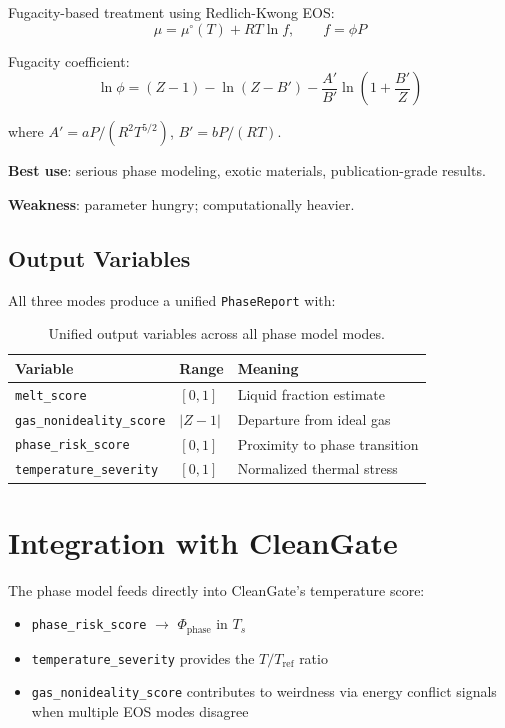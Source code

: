 \documentclass[11pt,a4paper]{article}
\begin{document}
Fugacity-based treatment using Redlich-Kwong EOS:
\begin{equation}
  \mu = \mu^\circ(T) + RT\ln f, \qquad f = \phi P
\end{equation}

Fugacity coefficient:
\begin{equation}
  \ln\phi = (Z-1) - \ln(Z - B') - \frac{A'}{B'}\ln\left(1 + \frac{B'}{Z}\right)
\end{equation}

where $A' = aP/(R^2 T^{5/2})$, $B' = bP/(RT)$.

\textbf{Best use}: serious phase modeling, exotic materials,
publication-grade results.

\textbf{Weakness}: parameter hungry; computationally heavier.

\subsection{Output Variables}

All three modes produce a unified \texttt{PhaseReport} with:

\begin{table}[h]
\centering
\begin{tabular}{lll}
\toprule
\textbf{Variable} & \textbf{Range} & \textbf{Meaning} \\
\midrule
\texttt{melt\_score}            & $[0,1]$ & Liquid fraction estimate \\
\texttt{gas\_nonideality\_score} & $|Z-1|$ & Departure from ideal gas \\
\texttt{phase\_risk\_score}      & $[0,1]$ & Proximity to phase transition \\
\texttt{temperature\_severity}   & $[0,1]$ & Normalized thermal stress \\
\bottomrule
\end{tabular}
\caption{Unified output variables across all phase model modes.}
\end{table}

\section{Integration with CleanGate}

The phase model feeds directly into CleanGate's temperature score:

\begin{itemize}
  \item \texttt{phase\_risk\_score} $\rightarrow$ $\Phi_{\text{phase}}$ in $T_s$
  \item \texttt{temperature\_severity} provides the $T/T_{\text{ref}}$ ratio
  \item \texttt{gas\_nonideality\_score} contributes to weirdness via
        energy conflict signals when multiple EOS modes disagree
\end{itemize}
\end{document}
